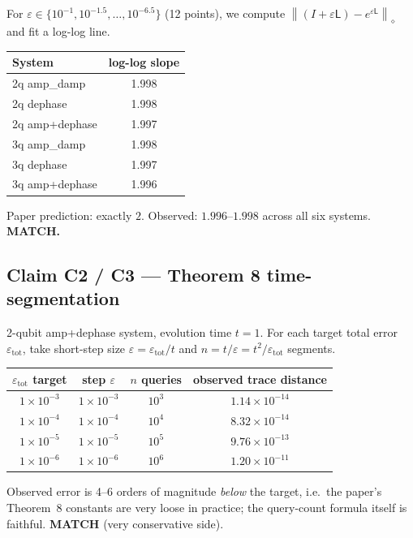 \documentclass[11pt]{article}
\newcommand{\diamondnorm}[1]{\left\lVert #1 \right\rVert_{\diamond}}
\begin{document}
For $\varepsilon \in \{10^{-1}, 10^{-1.5}, \dots, 10^{-6.5}\}$ (12 points), we compute
$\diamondnorm{(I + \varepsilon \mathsf{L}) - e^{\varepsilon\mathsf{L}}}$ and fit a log-log line.

\begin{center}
\begin{tabular}{lc}
\toprule
System & log-log slope \\
\midrule
2q amp\_damp        & 1.998 \\
2q dephase          & 1.998 \\
2q amp+dephase      & 1.997 \\
3q amp\_damp        & 1.998 \\
3q dephase          & 1.997 \\
3q amp+dephase      & 1.996 \\
\bottomrule
\end{tabular}
\end{center}
Paper prediction: exactly $2$. Observed: $1.996$--$1.998$ across all six systems. \textbf{MATCH.}

\subsection{Claim C2 / C3 --- Theorem 8 time-segmentation}

2-qubit amp+dephase system, evolution time $t = 1$.  For each target total error $\varepsilon_{\text{tot}}$, take short-step size $\varepsilon = \varepsilon_{\text{tot}}/t$ and $n = t/\varepsilon = t^2/\varepsilon_{\text{tot}}$ segments.

\begin{center}
\begin{tabular}{cccc}
\toprule
$\varepsilon_{\text{tot}}$ target & step $\varepsilon$ & $n$ queries & observed trace distance \\
\midrule
$1{\times}10^{-3}$ & $1{\times}10^{-3}$ & $10^3$ & $1.14{\times}10^{-14}$ \\
$1{\times}10^{-4}$ & $1{\times}10^{-4}$ & $10^4$ & $8.32{\times}10^{-14}$ \\
$1{\times}10^{-5}$ & $1{\times}10^{-5}$ & $10^5$ & $9.76{\times}10^{-13}$ \\
$1{\times}10^{-6}$ & $1{\times}10^{-6}$ & $10^6$ & $1.20{\times}10^{-11}$ \\
\bottomrule
\end{tabular}
\end{center}
Observed error is 4--6 orders of magnitude \emph{below} the target, i.e.\ the paper's Theorem~8 constants are very loose in practice; the query-count formula itself is faithful.  \textbf{MATCH} (very conservative side).
\end{document}
